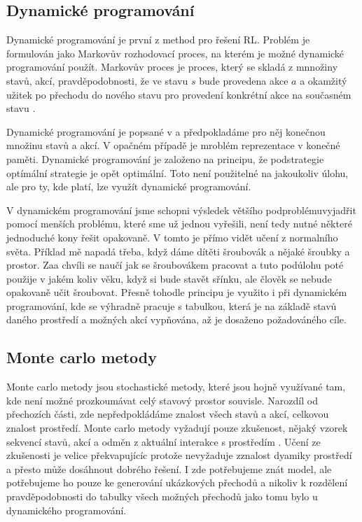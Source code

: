 \documentclass{article}
\begin{document}
\subsection{Dynamické programování}
Dynamické programování je první z method pro řešení RL. Problém je formulován jako Markovův rozhodovací proces, na kterém je možné dynamické programování použít. Markovův proces je proces, který se skladá z mnnožiny stavů, akcí, pravděpodobnosti, že ve stavu $s$ bude provedena akce $a$ a okamžitý užitek po přechodu do nového stavu pro provedení konkrétní akce na současném stavu \cite{sutton1998introduction}. 

Dynamické programování je popsané v \cite{sutton1998introduction} a předpokladáme pro něj konečnou množinu stavů a akcí. V opačném případě je mroblém reprezentace v konečné paměti. Dynamické programování je založeno na principu, že podstrategie optímální strategie je opět optimální. Toto není použitelné na jakoukoliv úlohu, ale pro ty, kde platí, lze využít dynamické programování. 

V dynamickém programování jsme schopni výsledek většího podproblémuvyjadřit pomocí menších problému, které sme už jednou vyřešili, není tedy nutné některé jednoduché kony řešit opakovaně. V tomto je přímo vidět učení z normalního světa. Příklad mě napadá třeba, když dáme dítěti šroubovák a nějaké šroubky a prostor. Zaa chvíli se naučí jak se šroubovákem pracovat a tuto podúlohu poté použije v jakém koliv věku, když si bude stavět sřínku, ale člověk se nebude opakovaně učit šroubovat. Přesně tohodle principu je využito i při dynamickém programování, kde se výhradně pracuje s tabulkou, která je na základě stavů daného prostředí a možných akcí vypňována, až je dosaženo požadováného cíle.

\subsection{Monte carlo metody}
Monte carlo metody jsou stochastické metody, které jsou hojně využívané tam, kde není možné prozkoumávat celý stavový prostor souvisle. Narozdíl od přechozích části, zde nepředpokládáme znalost všech stavů a akcí, celkovou znalost prostředí. Monte carlo metody vyžadují pouze zkušenost, nějaký vzorek sekvencí stavů, akcí a odměn z aktuální interakce s prostředím \cite{sutton1998introduction}. Učení ze zkušenosti je velice překvapujícíc protože nevyžaduje zznalost dyamiky prostředí a přesto může dosáhnout dobrého řešení. I zde potřebujeme znát model, ale potřebujeme ho pouze ke generování ukázkových přechodů a nikoliv k rozdělení pravděpodobnosti do tabulky všech možných přechodů jako tomu bylo u dynamického programování. 
\end{document}
